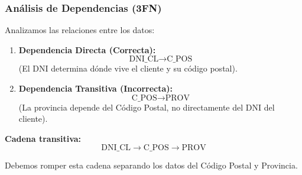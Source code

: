 \documentclass{beamer}
\begin{document}
\begin{frame}
  \frametitle{Análisis de Dependencias (3FN)}

  Analizamos las relaciones entre los datos:

  \begin{enumerate}
      \item \textbf{Dependencia Directa (Correcta):}
      $$ \text{DNI\_CL} \to \text{C\_POS} $$
      (El DNI determina dónde vive el cliente y su código postal).

      \item \textbf{Dependencia Transitiva (Incorrecta):}
      $$ \text{C\_POS} \to \text{PROV} $$
      (La provincia depende del Código Postal, no directamente del DNI del cliente).
  \end{enumerate}

  \vspace{1em}
  \textbf{Cadena transitiva:}
  $$ \text{DNI\_CL} \to \text{C\_POS} \to \text{PROV} $$
  
  Debemos romper esta cadena separando los datos del Código Postal y Provincia.
\end{frame}
\end{document}
